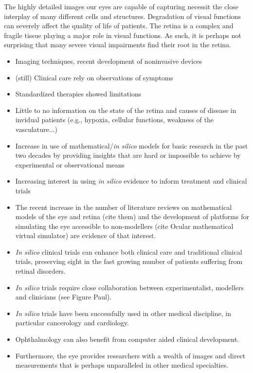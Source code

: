\documentclass[12pt,a4paper]{article}
\begin{document}
The highly detailed images our eyes are capable of capturing necessit the close interplay of many different cells and structures.
Degradation of visual functions can severely affect the quality of life of patients.
The retina is a complex and fragile tissue playing a major role in visual functions.
As such, it is perhaps not surprising that many severe visual impairments find their root in the retina.

\begin{itemize}
\item Imaging techniques, recent development of noninvasive devices
\item (still) Clinical care rely on observations of symptoms
\item Standardized therapies showed limitations
\item Little to no information on the state of the retina and causes of disease in invidual patients (e.g., hypoxia, cellular functions, weakness of the vasculature...)
\item Increase in use of mathematical/\textit{in silico} models for basic research in the past two decades by providing insights that are hard or impossible to achieve by experimental or observational means
\item Increasing interest in using \textit{in silico} evidence to inform treatment and clinical trials
\item The recent increase in the number of literature reviews on mathematical models of the eye and retina (cite them) and the development of platforms for simulating the eye accessible to non-modellers (cite Ocular mathematical virtual simulator) are evidence of that interest.
\item \textit{In silico} clinical trials can enhance both clinical care and traditional clinical trials, preserving sight in the fast growing number of patients suffering from retinal disorders.
\item \textit{In silico} trials require close collaboration between experimentalist, modellers and clinicians (see Figure Paul).
\item \textit{In silico} trials have been successfully used in other medical discipline, in particular cancerology and cardiology.
\item Ophthalmology can also benefit from computer aided clinical development.
\item Furthermore, the eye provides researchers with a wealth of images and direct measurements that is perhaps unparalleled in other medical specialties.

\end{itemize}
\end{document}
